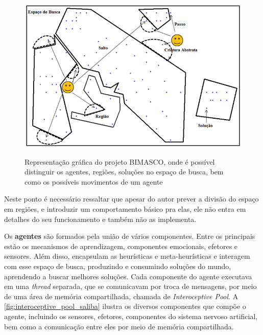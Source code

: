 \begin{figure}
    \centering
    \caption{Representação gráfica do projeto BIMASCO, onde é possível distinguir os agentes, regiões, soluções no espaço de busca, bem como os possíveis movimentos de um agente}
    \includegraphics[scale=0.45]{imagens/bimasco-saliba.png}
    \label{fig:bimasco_saliba}
\end{figure}


Neste ponto é necessário ressaltar que apesar do autor prever a divisão do espaço em regiões, e introduzir um comportamento básico pra elas, ele não entra em detalhes do seu funcionamento e também não as implementa.

Os \textbf{agentes} são formados pela união de vários componentes. Entre os principais estão os mecanismos de aprendizagem, componentes emocionais, efetores e sensores. Além disso, encapsulam as heurísticas e meta-heurísticas e interagem com esse espaço de busca, produzindo e consumindo soluções do mundo, aprendendo a buscar melhores soluções. Cada componente do agente executava em uma \textit{thread} separada, que se comunicavam por troca de mensagens, por meio de uma área de memória compartilhada, chamada de \textit{Interoceptive Pool}. A \autoref{fig:interoceptive_pool_saliba} ilustra os diversos componentes que compõe o agente, incluindo os sensores, efetores, componentes do sistema nervoso artificial, bem como a comunicação entre eles por meio de memória compartilhada.

